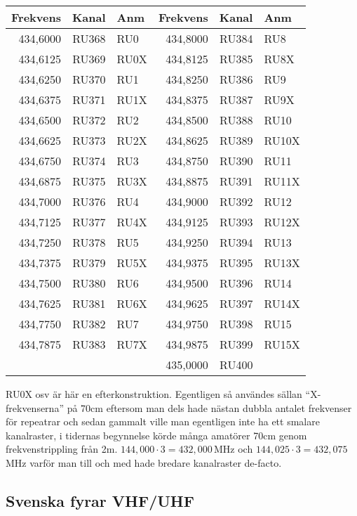 \begin{longtable}{rrl|rrl}
\textbf{Frekvens} & \textbf{Kanal} & \textbf{Anm}
&  \textbf{Frekvens} & \textbf{Kanal} & \textbf{Anm} \\ \hline

434,6000 & RU368 & RU0  & 434,8000 & RU384 & RU8   \\
434,6125 & RU369 & RU0X & 434,8125 & RU385 & RU8X  \\
434,6250 & RU370 & RU1  & 434,8250 & RU386 & RU9   \\
434,6375 & RU371 & RU1X & 434,8375 & RU387 & RU9X  \\
434,6500 & RU372 & RU2  & 434,8500 & RU388 & RU10  \\
434,6625 & RU373 & RU2X & 434,8625 & RU389 & RU10X \\
434,6750 & RU374 & RU3  & 434,8750 & RU390 & RU11  \\
434,6875 & RU375 & RU3X & 434,8875 & RU391 & RU11X \\
434,7000 & RU376 & RU4  & 434,9000 & RU392 & RU12  \\
434,7125 & RU377 & RU4X & 434,9125 & RU393 & RU12X \\
434,7250 & RU378 & RU5  & 434,9250 & RU394 & RU13  \\
434,7375 & RU379 & RU5X & 434,9375 & RU395 & RU13X \\
434,7500 & RU380 & RU6  & 434,9500 & RU396 & RU14  \\
434,7625 & RU381 & RU6X & 434,9625 & RU397 & RU14X \\
434,7750 & RU382 & RU7  & 434,9750 & RU398 & RU15  \\
434,7875 & RU383 & RU7X & 434,9875 & RU399 & RU15X \\
         &       &      & 435,0000 & RU400 &       \\

\end{longtable}

RU0X osv är här en efterkonstruktion. Egentligen så användes sällan
``X-frekvenserna'' på 70cm eftersom man dels hade nästan dubbla
antalet frekvenser för repeatrar och sedan gammalt ville man
egentligen inte ha ett smalare kanalraster, i tidernas begynnelse
körde många amatörer 70cm genom frekvenstrippling från 2m. $144,000
\cdot 3 = 432,000$\,MHz och $144,025 \cdot 3 = 432,075$\,MHz varför
man till och med hade bredare kanalraster de-facto.

\clearpage

\subsection{Svenska fyrar VHF/UHF}

